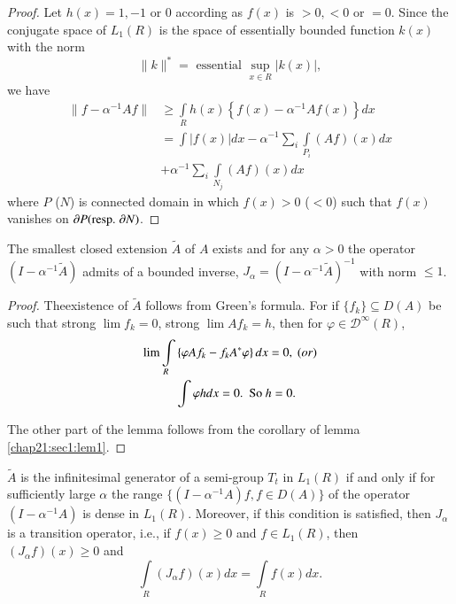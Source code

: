 \begin{proof}
 Let $h(x)=1,-1$ or $0$
 according as $f(x)$ is $>0, <0$ or $= 0$. Since the conjugate space of
 $L_1(R)$ is the space of essentially bounded function $k(x)$ with the
 norm 
 $$
 \parallel k \parallel^*= \text{ essential } \sup_{x \in R} |k(x)|,
 $$
 we have
 \begin{align*}
  \parallel f- \alpha^{-1} Af \parallel & \geq \int \limits_R h(x)
  \left\{ f(x)- \alpha^{-1} Af(x) \right\} dx\\ 
  &= \int |f(x)|dx- \alpha^{-1} \sum_i \int\limits_{P_i} (Af)(x)dx\\
  &+ \alpha^{-1}\sum_i \int \limits_{N_j} (Af)(x)dx
 \end{align*}
 where $P$ (\resp $N$) is connected domain in which $f(x)>0$ (\resp $<0$)
 such that $f(x)$ vanishes on $\partial P(\text{{resp.}\kern.3em} \partial N)$. 
\end{proof}

\begin{Lemma}\label{chap21:sec1:lem2}%
 The smallest closed extension $\tilde {A}$ of $A$ exists and for any
 $\alpha > 0$ the operator $(I- \alpha^{-1} \tilde {A})$ admits of a
 bounded inverse, $J_\alpha=(I-\alpha^{-1} \tilde{A})^{-1}$ with
 norm $\leq 1$. 
\end{Lemma}

\begin{proof}
 The\pageoriginale existence of $\tilde{A}$ follows from Green's formula. For if
 $\{ f_k \} \subseteq D(A)$ be such that
 strong $\lim f_k=0$, strong $\lim Af_k=h$, then for $\varphi \in
 \mathscr{D}^\infty (R)$, 
 \begin{align*}
  \lim \int \limits_R & \left\{ \varphi Af_k-f_k A^* \varphi
  \right\} dx=0, ~\text(or)\\ 
  & \int \varphi h dx=0. ~\text{ So}~ h=0.
 \end{align*}
 
 The other part of the lemma follows from the corollary of
 lemma \ref{chap21:sec1:lem1}. 
\end{proof}

\begin{Lemma}\label{chap21:sec1:lem3}%
 $\tilde {A}$ is the infinitesimal generator of a semi-group $T_t$ in
 $L_1(R)$ if and only if for sufficiently large $\alpha$ the range
 $\{ (I-\alpha^{-1} A)f,f \in D(A) \}$ of the operator $(I-
 \alpha^{-1}A)$ is dense in $L_1(R)$. Moreover, if this condition is
 satisfied, then $J_\alpha$ is a transition operator, i.e., if
 $f(x)\geq 0$ and $f \in L_1 (R)$, then $(J_\alpha f)(x)\geq 0$ and 
 $$
 \int \limits_R (J_ \alpha f)(x)dx= \int \limits_R f(x)dx.
 $$
\end{Lemma}

